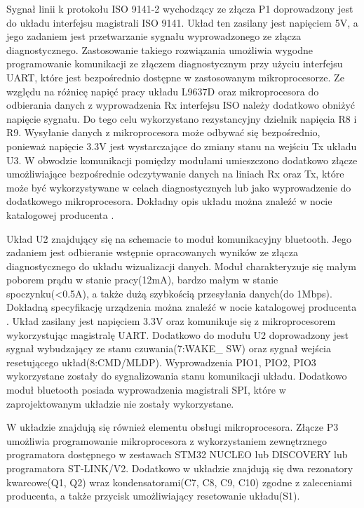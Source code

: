 \documentclass[12pt]{article} %
\numberwithin{equation}{subsection}
\numberwithin{figure}{section}
\numberwithin{table}{section}
\begin{document}
		Sygnał linii k protokołu ISO 9141-2 wychodzący ze złącza P1 doprowadzony jest do układu interfejsu magistrali ISO 9141. Układ ten zasilany jest napięciem 5V, a jego zadaniem jest przetwarzanie sygnału wyprowadzonego ze złącza diagnostycznego. Zastosowanie takiego rozwiązania umożliwia wygodne programowanie komunikacji ze złączem diagnostycznym przy użyciu interfejsu UART, które  jest bezpośrednio dostępne w zastosowanym mikroprocesorze. Ze względu na różnicę napięć pracy układu L9637D oraz mikroprocesora do odbierania danych z wyprowadzenia Rx interfejsu ISO należy dodatkowo obniżyć napięcie sygnału. Do tego celu wykorzystano rezystancyjny dzielnik napięcia R8 i R9. Wysyłanie danych z mikroprocesora może odbywać się bezpośrednio, ponieważ napięcie 3.3V jest wystarczające do zmiany stanu na wejściu Tx układu U3. W obwodzie komunikacji pomiędzy modułami umieszczono dodatkowo złącze umożliwiające bezpośrednie odczytywanie danych na liniach Rx oraz Tx, które może być wykorzystywane w celach diagnostycznych lub jako wyprowadzenie do dodatkowego mikroprocesora. Dokładny opis układu można znaleźć w nocie katalogowej producenta \cite{L9637D}.
		
		Układ U2 znajdujący się na schemacie to moduł komunikacyjny bluetooth. Jego zadaniem jest odbieranie wstępnie opracowanych wyników ze złącza diagnostycznego do układu wizualizacji danych. Moduł charakteryzuje się małym poborem prądu w stanie pracy(12mA), bardzo małym w stanie spoczynku(<0.5A), a także dużą szybkością przesyłania danych(do 1Mbps). Dokładną specyfikację urządzenia można znaleźć w nocie katalogowej producenta \cite{RN4020}. Układ zasilany jest napięciem 3.3V oraz komunikuje się z mikroprocesorem wykorzystując magistralę UART. Dodatkowo do modułu U2 doprowadzony jest sygnał wybudzający ze stanu czuwania(7:WAKE\_ SW) oraz sygnał wejścia resetującego układ(8:CMD/MLDP). Wyprowadzenia PIO1, PIO2, PIO3 wykorzystane zostały do sygnalizowania stanu komunikacji układu. Dodatkowo moduł bluetooth posiada wyprowadzenia magistrali SPI, które w zaprojektowanym układzie nie zostały wykorzystane. 
		
		\newpage		
		
		W układzie znajdują się również elementu obsługi mikroprocesora. Złącze P3 umożliwia programowanie mikroprocesora z wykorzystaniem zewnętrznego programatora dostępnego w zestawach STM32 NUCLEO lub DISCOVERY lub programatora ST-LINK/V2. Dodatkowo w układzie znajdują się dwa rezonatory kwarcowe(Q1, Q2) wraz kondensatorami(C7, C8, C9, C10) zgodne z zaleceniami producenta, a także przycisk umożliwiający resetowanie układu(S1). 
		
\end{document}
